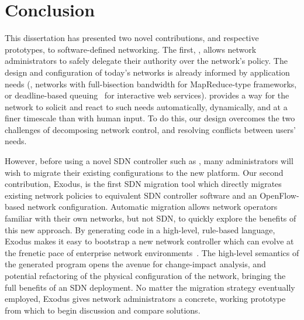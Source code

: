 
\chapter{Conclusion}
\label{sec:conclusion}

This dissertation has presented two novel contributions,
and respective prototypes, to software-defined networking.
The first, \sys, allows network administrators
to safely delegate their authority over the network's policy.
The design and configuration of today's networks is already informed
by application needs (\eg,
networks with full-bisection bandwidth for MapReduce-type frameworks,
or deadline-based queuing~\cite{Ballani:2011} for interactive web services).
\sys provides a way for the network to solicit and react to such needs
automatically, dynamically, and at a finer timescale than with human input.
To do this, our design overcomes the two challenges of decomposing network
control, and resolving conflicts between users' needs.


However, before using a novel SDN controller such as \sys, many administrators
will wish to migrate their existing configurations to the new platform.
Our second contribution,
Exodus, is the first SDN migration tool which directly migrates existing network
policies to equivalent SDN controller software and an OpenFlow-based
network configuration. Automatic migration allows network operators familiar
with their own networks, but not SDN, to quickly explore the benefits of this new
approach.
By generating code in a high-level, rule-based language, Exodus
makes it easy to bootstrap a new network controller which can evolve
at the frenetic pace of enterprise network environments~\cite{kim11evolution}.
The high-level semantics of the generated program opens the avenue
for change-impact analysis, and potential refactoring of the physical 
configuration of the network, bringing the full benefits of an SDN
deployment.
No matter the migration strategy eventually employed, Exodus gives
network administrators a concrete, working prototype from which to begin
discussion and compare solutions.

